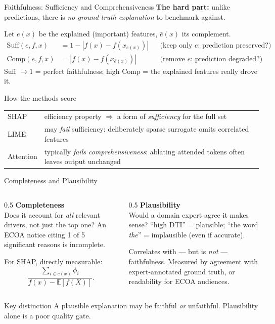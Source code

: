 \documentclass[9pt,t]{beamer}
\begin{document}
\begin{frame}{Faithfulness: Sufficiency and Comprehensiveness}
\textbf{The hard part:} unlike predictions, there is \emph{no ground-truth
explanation} to benchmark against.

\begin{underhood}
Let $e(x)$ be the explained (important) features, $\bar{e}(x)$ its complement.
\begin{align*}
\text{Suff}(e,f,x) &= 1 - |f(x) - f(x_{e(x)})|
  &&\text{(keep only }e\text{: prediction preserved?)}\\
\text{Comp}(e,f,x) &= |f(x) - f(x_{\bar{e}(x)})|
  &&\text{(remove }e\text{: prediction degraded?)}
\end{align*}
Suff $\to 1$ = perfect faithfulness; high Comp = the explained features really drove it.
\end{underhood}

\medskip
\begin{block}{How the methods score}
\begin{tabular}{ll}
SHAP & efficiency property $\Rightarrow$ a form of \emph{sufficiency} for the full set \\
LIME & may \emph{fail} sufficiency: deliberately sparse surrogate omits correlated features \\
Attention & typically \emph{fails comprehensiveness}: ablating attended tokens often
  leaves output unchanged
\end{tabular}
\end{block}
\end{frame}

\begin{frame}{Completeness and Plausibility}
\begin{columns}[T]
\begin{column}{0.5\textwidth}
\textbf{Completeness}\\
Does it account for \emph{all} relevant drivers, not just the top one? An ECOA
notice citing 1 of 5 significant reasons is incomplete.

\medskip
For SHAP, directly measurable:
\[
\frac{\sum_{i \in e(x)} \phi_i}{f(x) - \mathbb{E}[f(X)]}.
\]
\end{column}
\begin{column}{0.5\textwidth}
\textbf{Plausibility}\\
Would a domain expert agree it makes sense?
``high DTI'' = plausible; ``the word \emph{the}'' = implausible (even if accurate).

\medskip
Correlates with --- but is \emph{not} --- faithfulness. Measured by agreement with
expert-annotated ground truth, or readability for ECOA audiences.
\end{column}
\end{columns}

\medskip
\begin{alertblock}{Key distinction}
A plausible explanation may be faithful \emph{or} unfaithful. Plausibility alone
is a poor quality gate.
\end{alertblock}
\end{frame}
\end{document}
